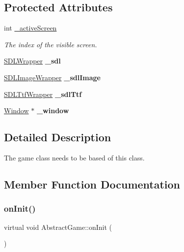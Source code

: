 \subsection*{Protected Attributes}
\begin{DoxyCompactItemize}
\item 
int \mbox{\hyperlink{class_abstract_game_ab5e3089bdd788319c1a240992018c355}{\+\_\+active\+Screen}}
\begin{DoxyCompactList}\small\item\em The index of the visible screen. \end{DoxyCompactList}\item 
\mbox{\label{class_abstract_game_ade8925d7eb607087ac30dbe0239b9a99}} 
\mbox{\hyperlink{struct_s_d_l_wrapper}{S\+D\+L\+Wrapper}} {\bfseries \+\_\+sdl}
\item 
\mbox{\label{class_abstract_game_a9c7d0cf75caa0964f71df6fbb8f96fc6}} 
\mbox{\hyperlink{struct_s_d_l_image_wrapper}{S\+D\+L\+Image\+Wrapper}} {\bfseries \+\_\+sdl\+Image}
\item 
\mbox{\label{class_abstract_game_adf290429d252d8209fcb4a6d8f879340}} 
\mbox{\hyperlink{struct_s_d_l_ttf_wrapper}{S\+D\+L\+Ttf\+Wrapper}} {\bfseries \+\_\+sdl\+Ttf}
\item 
\mbox{\label{class_abstract_game_aae4bc7ee9bd867ea9f072113dabf3e6f}} 
\mbox{\hyperlink{class_window}{Window}} $\ast$ {\bfseries \+\_\+window}
\end{DoxyCompactItemize}


\subsection{Detailed Description}
The game class needs to be based of this class. 



\subsection{Member Function Documentation}
\mbox{\label{class_abstract_game_ae0bd76d926812f81e5e637ade3b1015f}} 
\subsubsection{\texorpdfstring{on\+Init()}{onInit()}}
{\footnotesize\ttfamily virtual void Abstract\+Game\+::on\+Init (\begin{DoxyParamCaption}{ }\end{DoxyParamCaption})\hspace{0.3cm}{\ttfamily [pure virtual]}}



